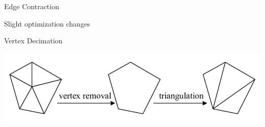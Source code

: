 




\begin{frame}{Edge Contraction}
    \begin{center}
        \item Slight optimization changes 
    \end{center}
   

\end{frame}
\begin{frame}{Vertex Decimation}
    \begin{center}
        \includegraphics[scale=.48]{images/vertex-dec.png}  
    \end{center}

\end{frame}


